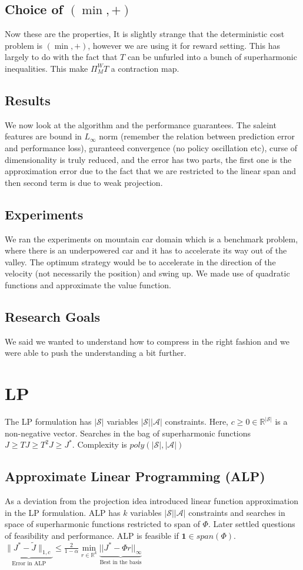 \documentclass{article}
\renewcommand{\S}{\mathcal{S}}
\newcommand{\A}{\mathcal{A}}
\newcommand{\R}{\mathbb{R}}
\newcommand{\tj}{\tilde{J}}
\newcommand{\minp}{(\min,+)}
\newcommand{\one}{\mathbf{1}}
\newcommand{\norm}[1]{\|#1\|}
\begin{document}
\subsection{Choice of $\minp$}
Now these are the properties,
It is slightly strange that the deterministic cost problem is $\minp$, however we are using it for reward setting. This has largely to do with the fact that $T$ can be unfurled into a bunch of superharmonic inequalities. This make $\Pi^W_M T$ a contraction map.
\subsection{Results}
We now look at the algorithm and the performance guarantees. The saleint features are bound in $L_\infty$ norm (remember the relation between prediction error and performance loss), guranteed convergence (no policy oscillation etc), curse of dimensionality is truly reduced, and the error has two parts, the first one is the approximation error due to the fact that we are restricted to the linear span and then second term is due to weak projection.
\subsection{Experiments}
We ran the experiments on mountain car domain which is a benchmark problem, where there is an underpowered car and it has to accelerate its way out of the valley. The optimum strategy would be to accelerate in the direction of the velocity (not necessarily the position) and swing up. We made use of quadratic functions and approximate the value function.
\subsection{Research Goals}
We said we wanted to understand how to compress in the right fashion and we were able to push the understanding a bit further.

\section{LP}
The LP formulation has  $|\S|$ variables $|\S||\A|$ constraints. Here, $c\geq 0 \in \R^{|\S|}$ is a non-negative vector. Searches in the bag of superharmonic functions $J\geq TJ\geq T^2J\geq J^*$. Complexity is $poly(|\S|,|\A|)$

\subsection{Approximate Linear Programming (ALP)}
As a deviation from the projection idea \cite{schweitzer1985generalized} introduced linear function approximation in the LP formulation. ALP has $k$ variables $|\S||\A|$ constraints and searches in space of {superharmonic} functions {{restricted}} to span of $\Phi$. Later \cite{de2003linear}  settled questions of feasibility and performance. ALP is feasible if $\one \in span(\Phi)$.
$\underbrace{\norm{J^*-\tj}_{1,c}}_{\text{Error in ALP}}\leq \frac{2}{1-\alpha}\underset{r\in \R^k}{\min}\underbrace{||J^*-\Phi r||_{\infty}}_{\text{Best in the basis}}$
\end{document}
